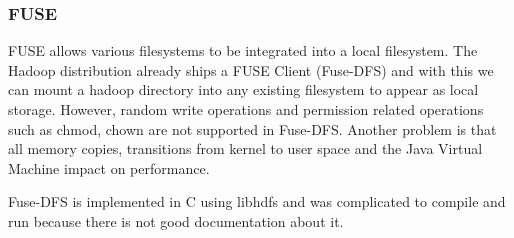 \subsubsection{FUSE}

FUSE allows various filesystems to be integrated into a local filesystem. The Hadoop distribution already ships a FUSE Client (Fuse-DFS) and with this we can mount a hadoop directory into any existing filesystem to appear as local storage.
However, random write operations and permission related operations such as chmod, chown are not supported in Fuse-DFS. Another problem is that all memory copies, transitions from kernel to user space and the Java Virtual Machine impact on performance.

Fuse-DFS is implemented in C using libhdfs and was complicated to compile and run because there is not good documentation about it.
